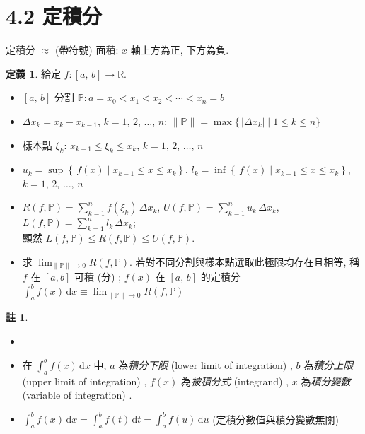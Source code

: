 \documentclass[12pt]{extarticle}
\newcommand{\ds}{\displaystyle}
\theoremstyle{definition}
\newtheorem*{dfn}{定義}
\newtheorem*{rmk}{註}
\newcommand{\myline}{\noindent\makebox[\linewidth]{\rule{\paperwidth}{0.4pt}}}
\begin{document}
\myline

\section*{4.2 定積分}

定積分 $\approx$  (帶符號) 面積: $x$ 軸上方為正, 下方為負. 

\begin{dfn}
  給定 $f:[a,\,b]\to\mathbb{R}$. 
  \begin{itemize}\setlength{\itemsep}{0pt}
    \item $[a,\,b]$ 分割 $\ds\mathbb{P}: a = x_0 < x_1 < x_2 < \cdots < x_n = b$
    \item $\ds\Delta x_k=x_k - x_{k-1}$, $k=1,\,2,\,\ldots,\,n$; $\ds\|\mathbb{P}\| = \max\{\,|\Delta x_k|\;|\;1\leqslant k\leqslant n\}$
    \item 樣本點 $\ds\xi_k$: $\ds x_{k-1} \leqslant \xi_k \leqslant x_k$, $k=1,\,2,\,\ldots,\,n$
    \item $\ds u_k = \sup\left\{\,f(x)\;|\;x_{k-1}\leqslant x\leqslant x_k\right\}$, $l_k = \inf\left\{\,f(x)\;|\;x_{k-1}\leqslant x\leqslant x_k\right\}$, $k=1,\,2,\,\ldots,\,n$
    \item $\ds R(f,\mathbb{P}) = \sum_{k=1}^n f(\xi_k)\,\Delta x_k$, $\ds U(f,\mathbb{P}) = \sum_{k=1}^n u_k\,\Delta x_k$, $\ds L(f,\mathbb{P}) = \sum_{k=1}^n l_k\,\Delta x_k$; \\顯然 $\ds L(f,\mathbb{P})\leqslant R(f,\mathbb{P})\leqslant U(f, \mathbb{P})$. 
    \item 求 $\ds\lim_{\|\mathbb{P}\|\to 0} R(f,\mathbb{P})$. 若對不同分割與樣本點選取此極限均存在且相等, 稱 $f$ 在 $[a, b]$ 可積 (分) ; $f(x)$ 在 $[a,\,b]$ 的定積分 $\ds\int_a^b f(x)\,\text{d}x \equiv \lim_{\|\mathbb{P}\|\to 0} R(f,\mathbb{P})$
  \end{itemize}
\end{dfn}

\begin{rmk}
  \begin{itemize}\setlength{\itemsep}{0pt}
    \item[]
    \item 在 $\ds\int_a^b f(x)\,\text{d}x$ 中, $a$ 為\emph{積分下限} (lower limit of integration) , $b$ 為\emph{積分上限} (upper limit of integration) , $f(x)$ 為\emph{被積分式} (integrand) , $x$ 為\emph{積分變數} (variable of integration) . 
    \item $\ds\int_a^b f(x)\,\text{d}x = \int_a^b f(t)\,\text{d}t = \int_a^b f(u)\,\text{d}u$  (定積分數值與積分變數無關) 
  \end{itemize}
\end{rmk}
\end{document}
